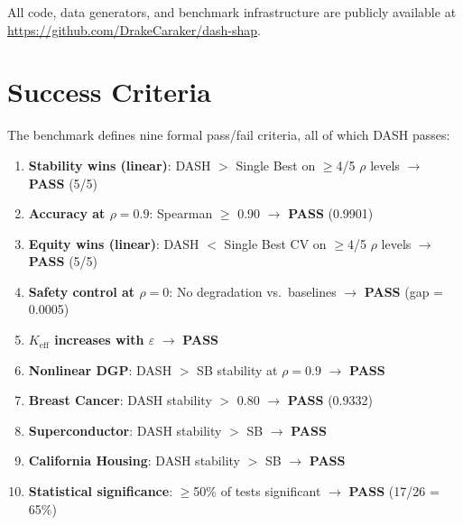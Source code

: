 \documentclass[11pt]{article}
\newcommand{\dash}{\textsc{DASH}}
\newcommand{\rhovar}{\rho}
\begin{document}
All code, data generators, and benchmark infrastructure are publicly
available at \url{https://github.com/DrakeCaraker/dash-shap}.

\section{Success Criteria}
\label{app:criteria}

The benchmark defines nine formal pass/fail criteria, all of which
\dash{} passes:

\begin{enumerate}
  \item \textbf{Stability wins (linear)}: DASH $>$ Single Best on $\geq$4/5
    $\rhovar$ levels $\to$ \textbf{PASS} (5/5)
  \item \textbf{Accuracy at $\rhovar = 0.9$}: Spearman $\geq$ 0.90 $\to$
    \textbf{PASS} (0.9901)
  \item \textbf{Equity wins (linear)}: DASH $<$ Single Best CV on $\geq$4/5
    $\rhovar$ levels $\to$ \textbf{PASS} (5/5)
  \item \textbf{Safety control at $\rhovar = 0$}: No degradation vs.\
    baselines $\to$ \textbf{PASS} (gap = 0.0005)
  \item \textbf{$K_{\text{eff}}$ increases with $\varepsilon$} $\to$
    \textbf{PASS}
  \item \textbf{Nonlinear DGP}: DASH $>$ SB stability at $\rhovar = 0.9$
    $\to$ \textbf{PASS}
  \item \textbf{Breast Cancer}: DASH stability $>$ 0.80 $\to$ \textbf{PASS}
    (0.9332)
  \item \textbf{Superconductor}: DASH stability $>$ SB $\to$ \textbf{PASS}
  \item \textbf{California Housing}: DASH stability $>$ SB $\to$ \textbf{PASS}
  \item \textbf{Statistical significance}: $\geq$50\% of tests significant
    $\to$ \textbf{PASS} (17/26 = 65\%)
\end{enumerate}
\end{document}
